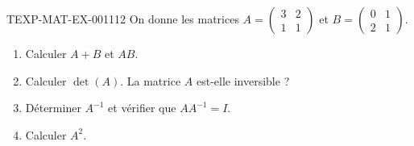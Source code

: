 \begin{exercice}{TEXP-MAT-EX-001}{1}{12}
On donne les matrices $A=\begin{pmatrix}3&2\\1&1\end{pmatrix}$ et $B=\begin{pmatrix}0&1\\2&1\end{pmatrix}$.
\begin{enumerate}
  \item Calculer $A+B$ et $AB$.
  \item Calculer $\det(A)$. La matrice $A$ est-elle inversible ?
  \item Déterminer $A^{-1}$ et vérifier que $AA^{-1}=I$.
  \item Calculer $A^2$.
\end{enumerate}
\end{exercice}
